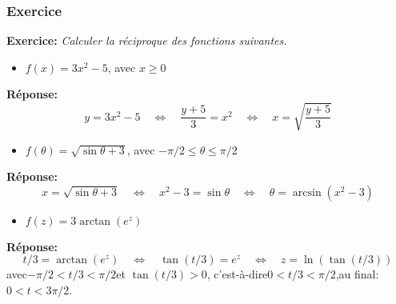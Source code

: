 \documentclass[10pt]{beamer}
\newcommand{\bitem}{\item[$\bullet$]}
\begin{document}
\begin{frame}[plain]
\frametitle{\bf Exercice}
\medskip 

{\bf Exercice:} 
{\em Calculer la r\'eciproque des fonctions suivantes.}
\vspace*{2mm}

\begin{itemize}
\bitem
$f(x)=3x^2-5$, avec $x\geq 0$
\end{itemize}
\vspace*{2mm}

\pause
{\bf R\'eponse:}\vspace*{-5mm} 
$$
y=3x^2-5 \quad\Leftrightarrow\quad 
\frac{y+5}{3}=x^2 \quad\Leftrightarrow\quad 
x=\sqrt{\frac{y+5}{3}}
$$

\pause
\begin{itemize}
\bitem
$f(\theta)=\sqrt{\sin\theta+3}$, avec $-\pi/2\leq \theta\leq \pi/2$
\end{itemize}
\vspace*{2mm}

\pause
{\bf R\'eponse:} \vspace*{-2mm} 
$$
x=\sqrt{\sin\theta+3} \quad\Leftrightarrow\quad 
x^2-3=\sin\theta \quad\Leftrightarrow\quad 
\theta=\arcsin(x^2-3)
$$

\pause
\begin{itemize}
\bitem
$f(z)=3\arctan(e^z)$ 
\end{itemize}
\vspace*{3mm}

\pause
{\bf R\'eponse:}  \vspace*{-2mm} 
$$ 
t/3=\arctan(e^z) \quad\Leftrightarrow\quad 
\tan(t/3)=e^z \quad\Leftrightarrow\quad 
z=\ln(\tan(t/3))
$$
avec\quad $-\pi/2<t/3<\pi/2$\quad et \quad $\tan(t/3)>0$,\quad 
c'est-\`a-dire\quad $0<t/3<\pi/2$,\quad au final:\quad $0<t<3\pi/2$.

\end{frame}


\begin{frame}
\end{frame}





\end{document}
